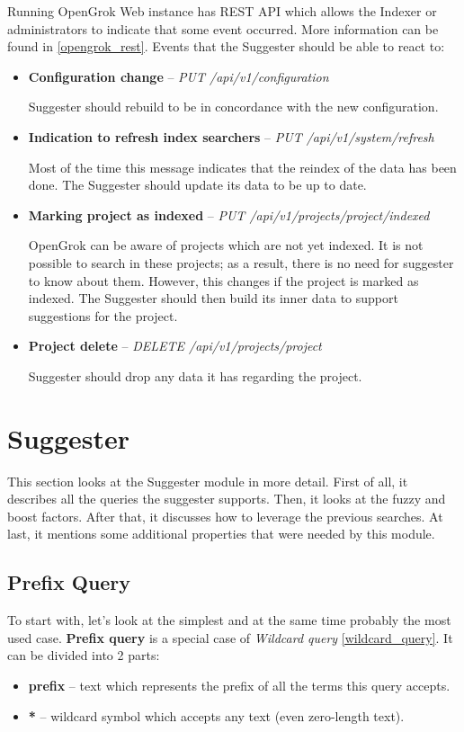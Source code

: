 Running OpenGrok Web instance has REST API which allows the Indexer or administrators to indicate that some event occurred.
More information can be found in \ref{opengrok_rest}. Events that the Suggester should be able to react to:
\begin{itemize}
    \item \textbf{Configuration change} – \textit{PUT /api/v1/configuration}

    Suggester should rebuild to be in concordance with the new configuration.
    \item \textbf{Indication to refresh index searchers} – \textit{PUT /api/v1/system/refresh}

    Most of the time this message indicates that the reindex of the data has been done. The Suggester
    should update its data to be up to date.

    \item \textbf{Marking project as indexed} – \textit{PUT /api/v1/projects/{project}/indexed}

    OpenGrok can be aware of projects which are not yet indexed. It is not possible to search in these projects;
    as a result, there is no need for suggester to know about them. However, this changes if the project is marked as indexed.
    The Suggester should then build its inner data to support suggestions for the project.

    \item \textbf{Project delete} – \textit{DELETE /api/v1/projects/{project}}

    Suggester should drop any data it has regarding the project.
\end{itemize}

\section{Suggester}
\label{suggester_module}
This section looks at the Suggester module in more detail. First of all, it describes all the queries the suggester supports.
Then, it looks at the fuzzy and boost factors. After that, it discusses how to leverage the previous searches. At last, it mentions some
additional properties that were needed by this module.

\subsection{Prefix Query}
\label{prefix_query}
To start with, let's look at the simplest and at the same time probably the most used case. \textbf{Prefix query} is a special case of
\textit{Wildcard query} \ref{wildcard_query}. %
It can be divided into 2 parts:
\begin{itemize}
    \item \textbf{prefix} – text which represents the prefix of all the terms this query accepts.
    \item \textbf{*} – wildcard symbol which accepts any text (even zero-length text).
\end{itemize}

